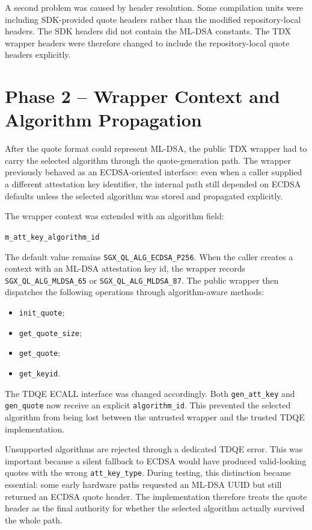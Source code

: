 A second problem was caused by header resolution. Some compilation units were
including SDK-provided quote headers rather than the modified repository-local
headers. The SDK headers did not contain the ML-DSA constants. The TDX wrapper
headers were therefore changed to include the repository-local quote headers
explicitly.

\section{Phase 2 -- Wrapper Context and Algorithm Propagation}

After the quote format could represent ML-DSA, the public TDX wrapper had to
carry the selected algorithm through the quote-generation path. The wrapper
previously behaved as an ECDSA-oriented interface: even when a caller supplied
a different attestation key identifier, the internal path still depended on
ECDSA defaults unless the selected algorithm was stored and propagated
explicitly.

The wrapper context was extended with an algorithm field:

\begin{center}
\texttt{m\_att\_key\_algorithm\_id}
\end{center}

The default value remains \texttt{SGX\_QL\_ALG\_ECDSA\_P256}. When the caller
creates a context with an ML-DSA attestation key id, the wrapper records
\texttt{SGX\_QL\_ALG\_MLDSA\_65} or \texttt{SGX\_QL\_ALG\_MLDSA\_87}. The
public wrapper then dispatches the following operations through
algorithm-aware methods:

\begin{itemize}
  \item \texttt{init\_quote};
  \item \texttt{get\_quote\_size};
  \item \texttt{get\_quote};
  \item \texttt{get\_keyid}.
\end{itemize}

The TDQE ECALL interface was changed accordingly. Both
\texttt{gen\_att\_key} and \texttt{gen\_quote} now receive an explicit
\texttt{algorithm\_id}. This prevented the selected algorithm from being lost
between the untrusted wrapper and the trusted TDQE implementation.

Unsupported algorithms are rejected through a dedicated TDQE error. This was
important because a silent fallback to ECDSA would have produced valid-looking
quotes with the wrong \texttt{att\_key\_type}. During testing, this distinction
became essential: some early hardware paths requested an ML-DSA UUID but still
returned an ECDSA quote header. The implementation therefore treats the quote
header as the final authority for whether the selected algorithm actually
survived the whole path.

